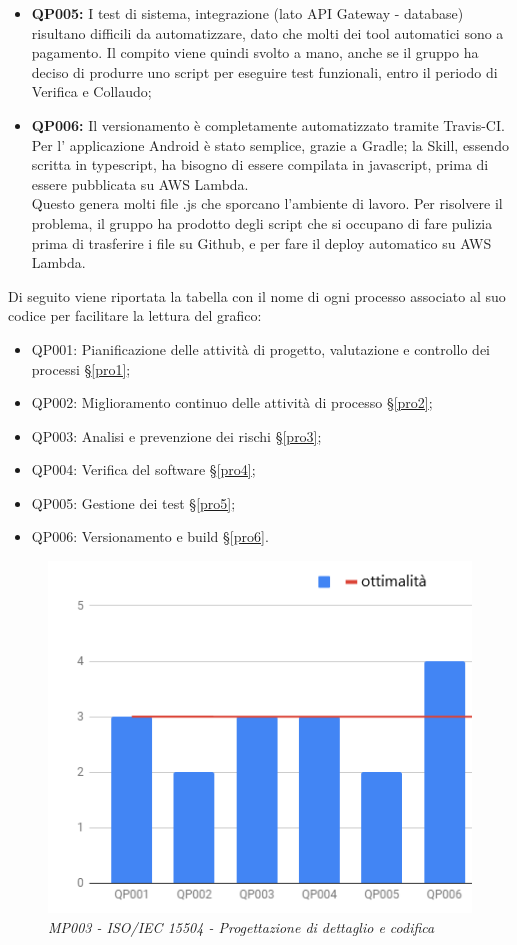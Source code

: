 \begin{itemize}
	\item \textbf{QP005:} I test di sistema, integrazione (lato API Gateway - database) risultano difficili da automatizzare, dato che molti dei tool automatici sono a pagamento. Il compito viene quindi svolto a mano, anche se il gruppo ha deciso di produrre uno script per eseguire test funzionali, entro il periodo di Verifica e Collaudo;
	\item \textbf{QP006:} Il versionamento è completamente automatizzato tramite Travis-CI. Per l' applicazione Android è stato semplice, grazie a Gradle; la Skill, essendo scritta in typescript, ha bisogno di essere compilata in javascript, prima di essere pubblicata su AWS Lambda. \\Questo genera molti file .js che sporcano l'ambiente di lavoro. Per risolvere il problema, il gruppo ha prodotto degli script che si occupano di fare pulizia prima di trasferire i file su Github, e per fare il deploy automatico su AWS Lambda.
\end{itemize}
Di seguito viene riportata la tabella con il nome di ogni processo associato al suo codice per facilitare la lettura del grafico:
\begin{itemize}
	\item QP001: Pianificazione delle attività di progetto, valutazione e controllo dei processi \S\ref{pro1};
	\item QP002: Miglioramento continuo delle attività di processo \S\ref{pro2};
	\item QP003: Analisi e prevenzione dei rischi \S\ref{pro3};
	\item QP004: Verifica del software \S\ref{pro4};
	\item QP005: Gestione dei test \S\ref{pro5};
	\item QP006: Versionamento e build \S\ref{pro6}.
\end{itemize}
\begin{figure}[H]
    \centering
	\includegraphics[scale=0.7]{./images/spicePDC.png}
    \caption{\textit{MP003 - ISO/IEC 15504 - Progettazione di dettaglio e codifica}}
\end{figure}

